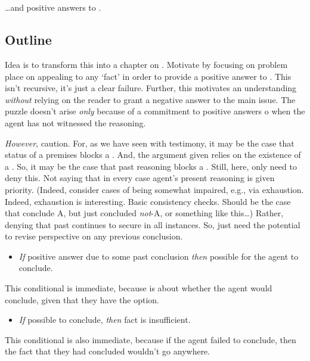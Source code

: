 \chapter{}
\label{cha:foregone-conclusions}

\begin{note}
  \dots and positive answers to \qzS{}.
\end{note}

\section{Outline}
\label{sec:outline}

\begin{note}
  Idea is to transform this into a chapter on \fc{}.
  Motivate \fc{} by focusing on problem  place on appealing to any `fact' in order to provide a positive answer to \qzS{}.
  This isn't recursive, it's just a clear failure.
  Further, this motivates an understanding \emph{without} relying on the reader to grant a negative answer to the main issue.
  The puzzle doesn't arise \emph{only} because of a commitment to positive answers o \qzS{} when the agent has not witnessed the reasoning.

  \emph{However}, caution.
  For, as we have seen with testimony, it may be the case that status of a premises blocks a \requ{}.
  And, the argument given relies on the existence of a \requ{}.
  So, it may be the case that past reasoning blocks a \requ{}.
  Still, here, only need to deny this.
  Not saying that in every case agent's present reasoning is given priority.
  (Indeed, consider cases of being somewhat impaired, e.g., via exhaustion.
  Indeed, exhaustion is interesting.
  Basic consistency checks.
  Should be the case that conclude A, but just concluded \emph{not}-A, or something like this\dots)
  Rather, denying that past continues to secure in all instances.
  So, just need the potential to revise perspective on any previous conclusion.
\end{note}

\begin{note}
  \begin{itemize}
  \item
    \emph{If} positive answer due to some past conclusion \emph{then} possible for the agent to conclude.
  \end{itemize}
  This conditional is immediate, because \qzS{} is about whether the agent would conclude, given that they have the option.
  \begin{itemize}
  \item
    \emph{If} possible to conclude, \emph{then} fact is insufficient.
  \end{itemize}
  This conditional is also immediate, because if the agent failed to conclude, then the fact that they had concluded wouldn't go anywhere.
\end{note}

